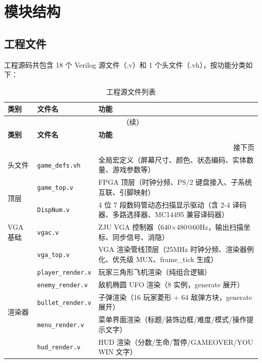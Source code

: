 \documentclass[12pt,a4paper]{ctexart}
\begin{document}
\section{模块结构}

\subsection{工程文件}

工程源码共包含 18 个 Verilog 源文件（.v）和 1 个头文件（.vh），按功能分类如下：

\begin{longtable}{llp{5.5cm}}
\caption{工程源文件列表}
\label{tab:files} \\
\toprule
\textbf{类别} & \textbf{文件名} & \textbf{功能} \\
\midrule
\endfirsthead
\multicolumn{3}{c}{\tablename\ \thetable{}（续）} \\
\toprule
\textbf{类别} & \textbf{文件名} & \textbf{功能} \\
\midrule
\endhead
\midrule
\multicolumn{3}{r}{\footnotesize 接下页} \\
\endfoot
\bottomrule
\endlastfoot
头文件 & \texttt{game\_defs.vh} & 全局宏定义（屏幕尺寸、颜色、状态编码、实体数量、游戏参数等） \\
\midrule
\multirow{2}{*}{顶层} & \texttt{game\_top.v} & FPGA 顶层（时钟分频、PS/2 键盘接入、子系统互联、引脚映射） \\
                       & \texttt{DispNum.v} & 4 位 7 段数码管动态扫描显示驱动（含 2-4 译码器、多路选择器、MC14495 兼容译码器） \\
\midrule
VGA 基础 & \texttt{vgac.v} & ZJU VGA 控制器（640$\times$480@60Hz，输出扫描坐标、同步信号、消隐） \\
          & \texttt{vga\_top.v} & VGA 渲染管线顶层（25MHz 时钟分频、渲染器例化、优先级 MUX、frame\_tick 生成） \\
\midrule
\multirow{5}{*}{渲染器} & \texttt{player\_render.v} & 玩家三角形飞机渲染（纯组合逻辑） \\
                         & \texttt{enemy\_render.v} & 敌机椭圆 UFO 渲染（8 实例，generate 展开） \\
                         & \texttt{bullet\_render.v} & 子弹渲染（16 玩家菱形 + 64 敌弹方块，generate 展开） \\
                         & \texttt{menu\_render.v} & 菜单界面渲染（标题/装饰边框/难度/模式/操作提示文字） \\
                         & \texttt{hud\_render.v} & HUD 渲染（分数/生命/暂停/GAMEOVER/YOU WIN 文字） \\

\end{longtable}
\end{document}
